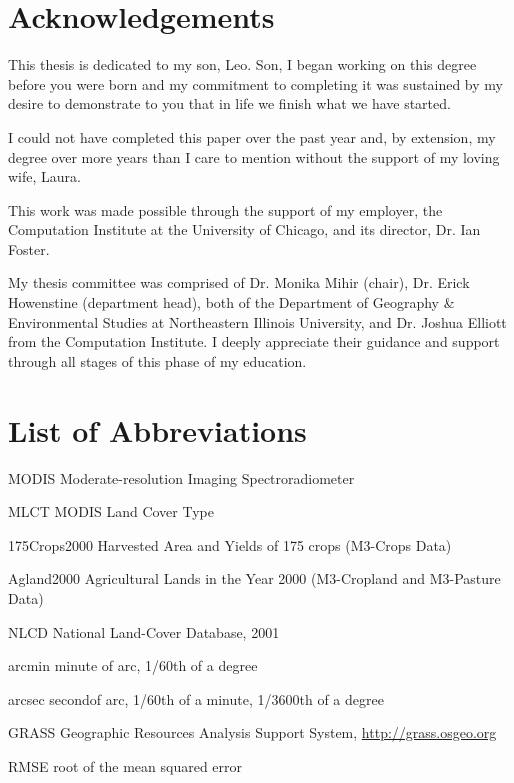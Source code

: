\documentclass[draftthesis]{neiuthesis}
\begin{document}
\chapter*{Acknowledgements}


This thesis is dedicated to my son, Leo.  Son, I began working on this
degree before you were born and my commitment to completing it was
sustained by my desire to demonstrate to you that in life we finish
what we have started.

I could not have completed this paper over the past year and, by
extension, my degree over more years than I care to mention without the
support of my loving wife, Laura.

This work was made possible through the support of my
employer, the Computation Institute at the University of Chicago, and its
director, Dr. Ian Foster.  

My thesis committee was comprised of Dr. Monika Mihir (chair),
Dr. Erick Howenstine (department head), both of the Department of
Geography \& Environmental Studies at Northeastern Illinois
University, and Dr. Joshua Elliott from the Computation Institute.  I
deeply appreciate their guidance and support through all stages of
this phase of my education.


\tableofcontents 
\listoftables
\listoffigures

\chapter{List of Abbreviations}

\begin{symbollist*}
\item[MODIS] Moderate-resolution Imaging Spectroradiometer
\item[MLCT] MODIS Land Cover Type \citep{MLCT}
\item[175Crops2000] Harvested Area and Yields of 175 crops (M3-Crops
  Data) \citep{Monfreda2008}
\item[Agland2000] Agricultural Lands in the Year 2000 (M3-Cropland and
  M3-Pasture Data) \citep{Ramankutty2008}
\item[NLCD] National Land-Cover Database, 2001 \citep{Homer2004}
\item[arcmin] minute of arc, 1/60th of a degree
\item[arcsec] secondof arc, 1/60th of a minute, 1/3600th of a degree
\item[GRASS] Geographic Resources Analysis Support System, \url{http://grass.osgeo.org}
\item[RMSE] root of the mean squared error

\end{symbollist*}
\end{document}
